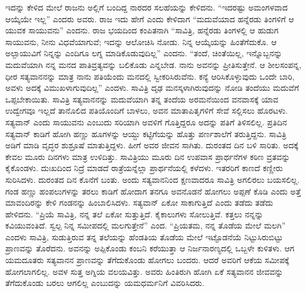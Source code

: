 \vskip 0.1cm

ಇದನ್ನು ಕೇಳಿದ ಮೇಲೆ ರಾಜನು ಅಲ್ಲಿಗೆ ಬಂದಿದ್ದ ನಾರದರ ಸಲಹೆಯನ್ನು ಕೇಳಿದನು. “ಇದರಷ್ಟು ಅಮಂಗಳವಾದ ಆಯ್ಕೆಯೇ ಇಲ್ಲ” ಎಂದರು ಅವರು. ರಾಜ ಇದು ಹೇಗೆ ಎಂದು ಕೇಳಿದಾಗ “ಮದುವೆಯಾದ ಹನ್ನೆರಡು ತಿಂಗಳಿಗೆ ಆ ಯುವಕ ಸಾಯುವನು” ಎಂದನು. ರಾಜ ಭಯದಿಂದ ಕಂಪಿತನಾಗಿ “ಸಾವಿತ್ರಿ, ಹನ್ನೆರಡು ತಿಂಗಳಲ್ಲಿ ಆ ಹುಡುಗ ಸಾಯುವನು, ನೀನು ವಿಧವೆಯಾಗುವೆ; ಇದನ್ನು ಆಲೋಚಿಸಿ ನೋಡು. ನಿನ್ನ ಆಯ್ಕೆಯನ್ನು ಹಿಂತೆಗೆದುಕೊ. ಆ ಅಲ್ಪಾಯುವಿಗೆ ನಿನ್ನನ್ನು ಎಂದಿಗೂ ಲಗ್ನ ಮಾಡಿಕೊಡುವುದಿಲ್ಲ” ಎಂದನು. “ತಂದೆ, ಚಿಂತೆಯಿಲ್ಲ, ಇನ್ನೊಬ್ಬನನ್ನು ಮದುವೆಯಾಗಿ ನನ್ನ ಮನದ ಪಾತಿವ್ರತ್ಯವನ್ನು ಬಲಿಕೊಡು ಎನ್ನಬೇಡ. ನಾನು ಅವನನ್ನು ಪ್ರೀತಿಸುತ್ತೇನೆ. ಆ ಶೀಲಸಂಪನ್ನ, ಧೀರ ಸತ್ಯವಾನನನ್ನು ಮಾತ್ರ ನಾನು ಪತಿಯೆಂದು ಮನದಲ್ಲಿ ಸ್ವೀಕರಿಸಿರುವೆನು. ಕನ್ಯೆ ಆರಿಸಿಕೊಳ್ಳುವುದು ಒಂದೇ ಬಾರಿ, ಅವಳು ಅದಕ್ಕೆ ವಿಮುಖಳಾಗುವುದಿಲ್ಲ” ಎಂದಳು. ಸಾವಿತ್ರಿ ದೃಢ ಮನಸ್ಕಳಾಗಿರುವುದನ್ನು ನೋಡಿ ತಂದೆಯು ಮದುವೆಗೆ ಒಪ್ಪಬೇಕಾಯಿತು. ಸಾವಿತ್ರಿ ಸತ್ಯವಾನನನ್ನು ಮದುವೆಯಾಗಿ ತನ್ನ ತಂದೆಯ ಅರಮನೆಯಿಂದ ವನವಾಸಕ್ಕೆ ಯಾವ ಉದ್ವೇಗವೂ ಇಲ್ಲದೆ ತಾನೊಲಿದ ಪತಿಯೊಂದಿಗೆ ಬಾಳಲು, ಅವನ ಮಾತಾಪಿತೃಗಳಿಗೆ ಸೇವೆ ಸಲ್ಲಿಸಲು ಹೊರಟಳು. ಸತ್ಯವಾನ್​ ಎಂದು ಸಾಯುವನು ಎಂಬುದು ಸರಿಯಾಗಿ ಅವಳಿಗೆ ಗೊತ್ತಿದ್ದರೂ ಅದನ್ನು ಪತಿಗೆ ತಿಳಿಸಲಿಲ್ಲ. ಪ್ರತಿದಿನ ಸತ್ಯವಾನ್​ ಕಾಡಿಗೆ ಹೋಗಿ ಹಣ್ಣು ಹೂಗಳನ್ನು ಆಯ್ದು ಕಟ್ಟಿಗೆಯನ್ನು ಹೊತ್ತು ಪರ್ಣಶಾಲೆಗೆ ತರುತ್ತಿದ್ದನು. ಸಾವಿತ್ರಿ ಅಡಿಗೆ ಮಾಡಿ ವೃದ್ಧರ ಶುಶ್ರೂಷೆ ಮಾತುತ್ತಿದ್ದಳು. ಹೀಗೆ ಅವರ ಜೀವನ ಸಾಗಿತು. ದುರಂತದ ದಿನ ಬಳಿ ಸಾರಿತು. ಅದಕ್ಕೆ ಕೇವಲ ಮೂರು ದಿನಗಳು ಮಾತ್ರ ಉಳಿದಿತ್ತು. ಸಾವಿತ್ರಿಯು ಮೂರು ದಿನ ಉಪವಾಸ ಪ್ರಾರ್ಥನೆಗಳ ಕಠಿಣ ವ್ರತವನ್ನು ಕೈಕೊಂಡಳು. ದುಃಖದಿಂದ ನಿದ್ರೆ ಮಾಡದೆ ರಾತ್ರೆಯನ್ನೆಲ್ಲಾ ಪ್ರಾರ್ಥನೆಯಲ್ಲಿ ಕಳೆದಳು. ಇತರರಿಗೆ ಕಾಣದೆ ಕಣ್ಣೀರು ಸುರಿಸಿದಳು. ದುರಂತದ ದಿನ ಕೊನೆಗೆ ಬಂತು. ಅಂದು ಸತ್ಯವಾನನಿಂದ ಕ್ಷಣವಾದರೂ ಸಾವಿತ್ರಿ ಅಗಲಿರಲು ಬಯಸಲಿಲ್ಲ. ಗಂಡ ಹಣ್ಣು ಹಂಪಲುಗಳನ್ನು ತರಲು ಕಾಡಿಗೆ ಹೋದಾಗ ತನಗೂ ಅವನೊಡನೆ ಹೋಗಲು ಅಪ್ಪಣೆ ಕೊಡಿ ಎಂದು ಅತ್ತೆ ಮಾವಂದಿರನ್ನು ಕೇಳಿ ಗಂಡನನ್ನು ಹಿಂಬಾಲಿಸಿದಳು. ಸತ್ಯವಾನ್​ ಏಕೋ ಸಾಕಾಗುತ್ತಿದೆ ಎಂದು ತಡೆದು ತಡೆದು ಹೇಳಿದನು. “ಪ್ರಿಯೆ ಸಾವಿತ್ರಿ, ನನ್ನ ತಲೆ ಏಕೋ ಸುತ್ತುತ್ತಿದೆ. ಕೈಕಾಲುಗಳು ಸೋಲುತ್ತಿವೆ. ಕತ್ತಲು ನನ್ನನ್ನು ಕವಿಯುವಂತಿದೆ. ಸ್ವಲ್ಪ ನಿನ್ನ ಸಮೀಪದಲ್ಲಿ ಮಲಗುತ್ತೇನೆ” ಎಂದ. “ಪ್ರಿಯತಮ, ನನ್ನ ತೊಡೆಯ ಮೇಲೆ ಮಲಗಿ” ಎಂದಳು ಸಾವಿತ್ರಿ, ಸುಡುತ್ತಿರುವ ತನ್ನ ತಲೆಯನ್ನು ಹೆಂಡತಿಯ ತೊಡೆಯ ಮೇಲೆ ಇಟ್ಟೊಡನೆಯೆ ನಿಟ್ಟುಸಿರುಬಿಟ್ಟು ಪ್ರಾಣವನ್ನು ತೊರೆದನು. ಅವನನ್ನು ಅಪ್ಪಿಕೊಂಡು ಕಂಬನಿ ಕರೆಯುತ್ತಾ ಆ ನಿರ್ಜನಾರಣ್ಯದಲ್ಲಿ ಒಬ್ಬಳೇ ಕುಳಿತಳು. ಆಗ ಯಮದೂತರು ಸತ್ಯವಾನನ ಪ್ರಾಣವನ್ನು ತೆಗೆದುಕೊಂಡು ಹೋಗಲು ಬಂದರು. ಆದರೆ ಅವರಿಗೆ ಆಕೆಯ ಸಮೀಪಕ್ಕೆ ಹೋಗಲಾಗಲಿಲ್ಲ. ಅವಳ ಸುತ್ತ ಅಗ್ನಿಯ ವಲಯವಿತ್ತು. ಅವರು ಹಿಂತಿರುಗಿ ಹೋಗಿ ಏಕೆ ಸತ್ಯವಾನನ ಜೀವವನ್ನು ತೆಗೆದುಕೊಂಡು ಬರಲು ಆಗಲಿಲ್ಲ ಎಂಬುದನ್ನು ಯಮಧರ್ಮನಿಗೆ ವಿವರಿಸಿದರು.

\vskip 0.1cm

